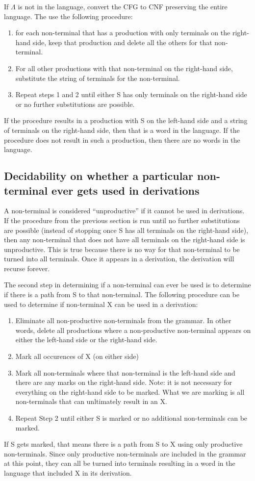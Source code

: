 \documentclass[letterpaper,12pt,openany,reqno]{book}%
\begin{document}
If $\Lambda$ is not in the language, convert the CFG to CNF preserving the entire language. The use the following procedure:
\begin{enumerate}
\item for each non-terminal that has a production with only terminals on the right-hand side, keep that production and delete all the others for that non-terminal.
\item For all other productions with that non-terminal on the right-hand side, substitute the string of terminals for the non-terminal.
\item Repeat steps 1 and 2 until either S has only terminals on the right-hand side or no further substitutions are possible.
\end{enumerate}
If the procedure results in a production with S on the left-hand side and a string of terminals on the right-hand side, then that is a word in the language. If the procedure does not result in such a production, then there are no words in the language.

\subsection{Decidability on whether a particular non-terminal ever gets used in derivations}
A non-terminal is considered ``unproductive'' if it cannot be used in derivations. If the procedure from the previous section is run until no further substitutions are possible (instead of stopping once S has all terminals on the right-hand side), then any non-terminal that does not have all terminals on the right-hand side is unproductive. This is true because there is no way for that non-terminal to be turned into all terminals. Once it appears in a derivation, the derivation will recurse forever.

The second step in determining if a non-terminal can ever be used is to determine if there is a path from S to that non-terminal. The following procedure can be used to determine if non-terminal X can be used in a derivation:
\begin{enumerate}
\item Eliminate all non-productive non-terminals from the grammar. In other words, delete all productions where a non-productive non-terminal appears on either the left-hand side or the right-hand side.
\item Mark all occurences of X (on either side)
\item Mark all non-terminals where that non-terminal is the left-hand side and there are any marks on the right-hand side. Note: it is not necessary for everything on the right-hand side to be marked. What we are marking is all non-terminals that can unltimately result in an X.
\item Repeat Step 2 until either S is marked or no additional non-terminals can be marked.
\end{enumerate}
If S gets marked, that means there is a path from S to X using only productive non-terminals. Since only productive non-terminals are included in the grammar at this point, they can all be turned into terminals resulting in a word in the language that included X in its derivation.
\end{document}
